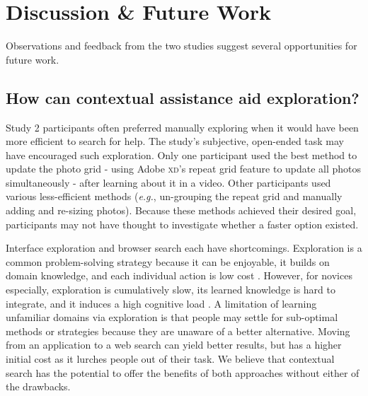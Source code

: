 \section{Discussion \& Future Work}
Observations and feedback from the two studies suggest several opportunities for future work. 

\subsection{How can contextual assistance aid exploration?}

Study 2 participants often preferred manually exploring when it would have been more efficient to search for help. The study's subjective, open-ended task may have encouraged such exploration. Only one participant used the best method to update the photo grid - using Adobe \textsc{xd}'s repeat grid feature to update all photos simultaneously - after learning about it in a video. Other participants used various less-efficient methods (\textit{e.g.}, un-grouping the repeat grid and manually adding and re-sizing photos). Because these methods achieved their desired goal, participants may not have thought to investigate whether a faster option existed.

Interface exploration and browser search each have shortcomings. Exploration is a common problem-solving strategy because it can be enjoyable, it builds on domain knowledge, and each individual action is low cost \cite{Lafreniere2014a, Rieman1996}. However, for novices especially, exploration is cumulatively slow, its learned knowledge is hard to integrate, and it induces a high cognitive load \cite{Tuovinen1999, Lafreniere2014a}. A limitation of learning unfamiliar domains via exploration is that people may settle for sub-optimal methods or strategies because they are unaware of a better alternative. Moving from an application to a web search can yield better results, but has a higher initial cost as it lurches people out of their task. We believe that contextual search has the potential to offer the benefits of both approaches without either of the drawbacks. 

